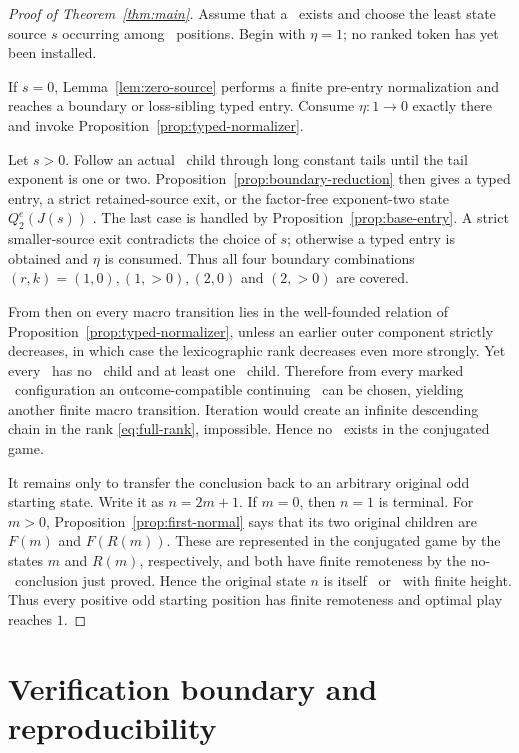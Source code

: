 \begin{proof}[Proof of Theorem~\ref{thm:main}]
Assume that a \DRAW\ exists and choose the least state source $s$ occurring
among \DRAW\ positions. Begin with $\eta=1$; no ranked token has yet been installed.

If $s=0$, Lemma~\ref{lem:zero-source} performs a finite pre-entry
normalization and reaches a boundary or loss-sibling typed entry. Consume
$\eta:1\to0$ exactly there and invoke Proposition~\ref{prop:typed-normalizer}.

Let $s>0$. Follow an actual \DRAW\ child through long constant tails until
the tail exponent is one or two. Proposition~\ref{prop:boundary-reduction}
then gives a typed entry, a strict retained-source exit, or the factor-free
exponent-two state $Q_2^e(J(s))$ \DRAW. The last case is handled by
Proposition~\ref{prop:base-entry}. A strict smaller-source exit contradicts
the choice of $s$; otherwise a typed entry is obtained and $\eta$ is
consumed. Thus all four boundary combinations $(r,k)=(1,0),(1,>0),(2,0)$ and
$(2,>0)$ are covered.

From then on every macro transition lies in the well-founded relation of
Proposition~\ref{prop:typed-normalizer}, unless an earlier outer component
strictly decreases, in which case the lexicographic rank decreases even more
strongly. Yet every \DRAW\ has no \LOSS\ child and at least one \DRAW\ child.
Therefore from every marked \DRAW\ configuration an outcome-compatible
continuing \DRAW\ can be chosen, yielding another finite macro transition.
Iteration would create an infinite descending chain in the rank
\eqref{eq:full-rank}, impossible. Hence no \DRAW\ exists in the conjugated
game.

It remains only to transfer the conclusion back to an arbitrary original
odd starting state. Write it as $n=2m+1$. If $m=0$, then $n=1$ is terminal.
For $m>0$, Proposition~\ref{prop:first-normal} says that its two original
children are $F(m)$ and $F(R(m))$. These are represented in the conjugated game
by the states $m$ and $R(m)$, respectively, and both have finite remoteness by
the no-\DRAW\ conclusion just proved. Hence the original state $n$ is itself
\WIN\ or \LOSS\ with finite height. Thus every positive odd starting position
has finite remoteness and optimal play reaches $1$.
\end{proof}

\section{Verification boundary and reproducibility}

